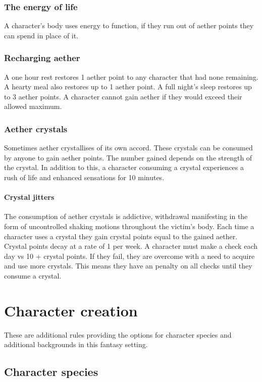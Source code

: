 \documentclass[a4paper,11pt,oneside]{book}
\newcommand{\textlf}[1]{\textbf{\titlecap{#1}}}
\begin{document}
\subsection{The energy of life}
A character's body uses energy to function, if they run out of aether points they can spend \textlf{endurance} in place of it.

\subsection{Recharging aether}
A one hour rest restores 1 aether point to any character that had none remaining. A hearty meal also restores up to 1 aether point. A full night's sleep restores up to 3 aether points. A character cannot gain aether if they would exceed their allowed maximum.

\subsection{Aether crystals}
Sometimes aether crystallises of its own accord. These crystals can be consumed by anyone to gain aether points. The number gained depends on the strength of the crystal. In addition to this, a character consuming a crystal experiences a rush of life and enhanced sensations for 10 minutes.
\subsubsection{Crystal jitters}
The consumption of aether crystals is addictive, withdrawal manifesting in the form of uncontrolled shaking motions throughout the victim's body. Each time a character uses a crystal they gain crystal points equal to the gained aether. Crystal points decay at a rate of 1 per week. A character must make a \textlf{resolve} check each day vs 10 + crystal points. If they fail, they are overcome with a need to acquire and use more crystals. This means they have an \textlf{edge} penalty on all checks until they consume a crystal.   




\chapter{Character creation}
These are additional rules providing the options for character species and additional backgrounds in this fantasy setting.

\section{Character species}
\end{document}
